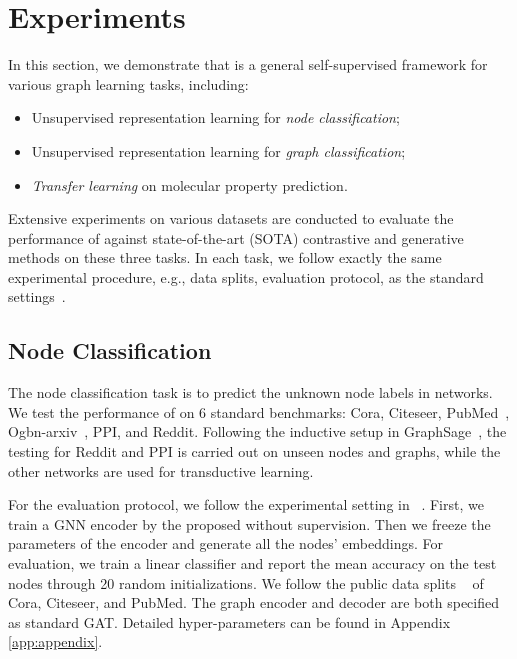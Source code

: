 \section{Experiments}\label{sec:experiments}

In this section, we demonstrate that \model  is a general self-supervised framework for various graph learning tasks, including:
\begin{itemize}[leftmargin=*,itemsep=0pt,parsep=0.5em,topsep=0.3em,partopsep=0.3em]
    \item Unsupervised representation learning for \textit{node classification};
    \item Unsupervised representation learning for \textit{graph classification};
    \item \textit{Transfer learning} on molecular property prediction.
\end{itemize}
Extensive experiments on various datasets are conducted to evaluate 
the performance of \model against state-of-the-art (SOTA) contrastive and generative methods on these three tasks. 
In each task, we follow exactly the same experimental procedure, e.g., data splits, evaluation protocol, as the  standard settings~\cite{velivckovic2018deep,zhang2021canonical,sun2019infograph,hu2020strategies}. 




\subsection{Node Classification}




The node classification task is to predict the unknown node labels in networks. 
We test the performance of \model on 6 standard benchmarks: Cora, Citeseer, PubMed~\cite{yang2016revisiting}, Ogbn-arxiv~\cite{hu2020open}, PPI, and Reddit. 
Following the inductive setup in GraphSage~\cite{hamilton2017inductive}, the testing for Reddit and PPI is carried out on unseen nodes and graphs, while the other networks are used for transductive learning.

For the evaluation protocol, we follow the experimental setting in ~\cite{velivckovic2018deep,hassani2020contrastive,thakoor2021bootstrapped,zhang2021canonical}. 
First, we train a GNN encoder by the proposed \model without supervision. 
Then we freeze the parameters of the encoder and generate all the nodes' embeddings. 
For evaluation, we train a linear classifier and report the mean accuracy on the test nodes through 20 random initializations. 
We follow the public data splits ~\cite{velivckovic2018deep,hassani2020contrastive,zhang2021canonical}  of Cora, Citeseer, and PubMed. 
The graph encoder  and decoder  are both specified as standard GAT. 
Detailed hyper-parameters can be found in  Appendix \ref{app:appendix}.


